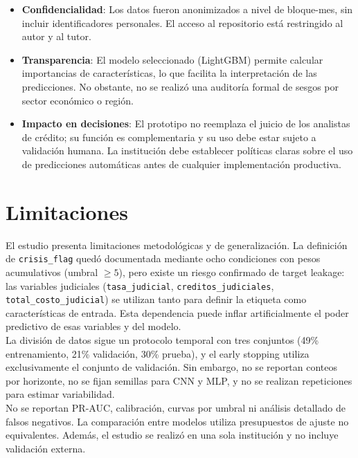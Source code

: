 \begin{itemize}
    \item \textbf{Confidencialidad}: Los datos fueron anonimizados a nivel de bloque-mes, sin incluir identificadores personales. El acceso al repositorio está restringido al autor y al tutor.
    \item \textbf{Transparencia}: El modelo seleccionado (LightGBM) permite calcular importancias de características, lo que facilita la interpretación de las predicciones. No obstante, no se realizó una auditoría formal de sesgos por sector económico o región.
    \item \textbf{Impacto en decisiones}: El prototipo no reemplaza el juicio de los analistas de crédito; su función es complementaria y su uso debe estar sujeto a validación humana. La institución debe establecer políticas claras sobre el uso de predicciones automáticas antes de cualquier implementación productiva.
\end{itemize}

\section{Limitaciones}

El estudio presenta limitaciones metodológicas y de generalización. La definición de \texttt{crisis\_flag} quedó documentada mediante ocho condiciones con pesos acumulativos (umbral $\geq 5$), pero existe un riesgo confirmado de target leakage: las variables judiciales (\texttt{tasa\_judicial}, \texttt{creditos\_judiciales}, \texttt{total\_costo\_judicial}) se utilizan tanto para definir la etiqueta como características de entrada. Esta dependencia puede inflar artificialmente el poder predictivo de esas variables y del modelo.\\

La división de datos sigue un protocolo temporal con tres conjuntos (49\% entrenamiento, 21\% validación, 30\% prueba), y el early stopping utiliza exclusivamente el conjunto de validación. Sin embargo, no se reportan conteos por horizonte, no se fijan semillas para CNN y MLP, y no se realizan repeticiones para estimar variabilidad.\\

No se reportan PR-AUC, calibración, curvas por umbral ni análisis detallado de falsos negativos. La comparación entre modelos utiliza presupuestos de ajuste no equivalentes. Además, el estudio se realizó en una sola institución y no incluye validación externa.\\

